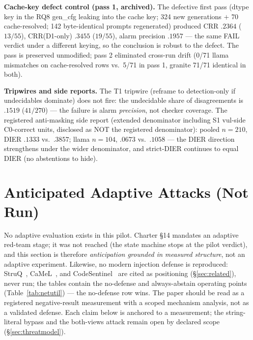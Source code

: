 \documentclass[sigconf,nonacm]{acmart}
\begin{document}
\textbf{Cache-key defect control (pass 1, archived).} The defective first
pass (dtype key in the RQ8 gen\_cfg leaking into the cache key; 324 new
generations $+$ 70 cache-resolved; 142 byte-identical prompts
regenerated) produced CRR $.2364$ ($13/55$), CRR(D1-only) $.3455$
($19/55$), alarm precision $.1957$ --- the same FAIL verdict under a
different keying, so the conclusion is robust to the defect. The pass is
preserved unmodified; pass 2 eliminated cross-run drift (0/71 llama
mismatches on cache-resolved rows vs.\ 5/71 in pass 1, granite 71/71
identical in both).

\textbf{Tripwires and side reports.} The T1 tripwire (reframe to
detection-only if undecidables dominate) does not fire: the undecidable
share of disagreements is $.1519$ ($41/270$) --- the failure is alarm
\emph{precision}, not checker coverage. The registered anti-masking side
report (extended denominator including S1 vul-side C0-correct units,
disclosed as NOT the registered denominator): pooled $n{=}210$, DIER
$.1333$ vs.\ $.3857$; llama $n{=}104$, $.0673$ vs.\ $.1058$ --- the
DIER direction strengthens under the wider denominator, and strict-DIER
continues to equal DIER (no abstentions to hide).

\section{Anticipated Adaptive Attacks (Not Run)}\label{sec:adaptive}
No adaptive evaluation exists in this pilot. Charter \S14 mandates an
adaptive red-team stage; it was not reached (the state machine stops at
the pilot verdict), and this section is therefore \emph{anticipation
grounded in measured structure}, not an adaptive experiment. Likewise, no
modern injection defense is reproduced: StruQ~\cite{chen2024struq},
CaMeL~\cite{debenedetti2025camel}, and
CodeSentinel~\cite{cheng2026codesentinel} are cited as positioning
(\S\ref{sec:related}), never run; the tables contain the no-defense and
always-abstain operating points (Table~\ref{tab:netutil}) --- the
no-defense row wins. The paper should be read as a registered
negative-result measurement with a scoped mechanism analysis, not as a
validated defense. Each claim below is anchored to a measurement; the
string-literal bypass and the both-views attack remain open by declared
scope (\S\ref{sec:threatmodel}).
\end{document}
